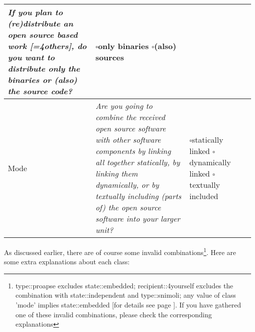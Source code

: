 \begin{small}
\begin{tabular}[h]{|l|l|l|l|}
{  \textit{If you plan to (re)distribute an open source based work [=4others], do
  you want to distribute only the binaries or (also) the source code?}}
  & \parbox{10em}{
    $\square$\hspace{1em}only binaries\\
    $\square$\hspace{1em}(also) sources}\\
\hline 
  Mode & 
  \parbox[c][2.6cm][c]{9.4cm}{
  \textit{Are you going to combine the received open source software with other
  software components by linking all together statically, by linking them
  dynamically, or by textually including (parts of) the open source software
  into your larger unit?}} &
  \parbox{10em}{
    $\square$\hspace{1em}statically linked\\   
    $\square$\hspace{1em}dynamically linked\\
    $\square$\hspace{1em}textually included}\\
\hline 
\hline
\end{tabular}
\end{small}

As discussed earlier, there are of course some invalid
combinations\footnote{type::proapse excludes state::embedded;
recipient::4yourself excludes the combination with state::independent and
type::snimoli; any value of class 'mode' implies state::embedded [for details
see page \pageref{InvalidFinderTokenCombinations}]. If you have gathered one of
these invalid combinations, please check the corresponding explanations}. Here
are some extra explanations about each class:

